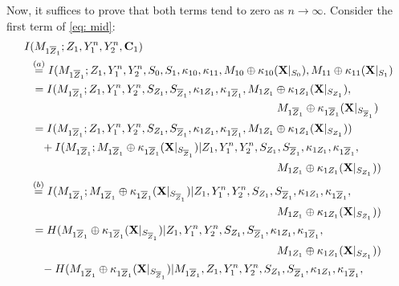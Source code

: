 \documentclass[runningheads]{llncs}
\newcommand{\parbreak}{ \vspace{0.3 em}}
\begin{document}
\begin{itemize}
    \parbreak Now, it suffices to prove that both terms tend to zero as $n\to\infty$. Consider the first term of \eqref{eq: mid}:
\begin{align}\label{final2: BC-nColl}
        I &(  M_{1\overline{Z}_1};Z_1, Y_1^n, Y_2^n,  \mathbf{C}_1)\notag\\
        & \overset{(a)}{=} I (  M_{1\overline{Z}_1};Z_1, Y_1^n, Y_2^n,  S_0,S_1, \kappa_{10}, \kappa_{11}, M_{10}\oplus\kappa_{10} (\mathbf{X}|_{S_0}), M_{11}\oplus\kappa_{11}(\mathbf{X}|_{S_1})\notag\\
        & \, = I (  M_{1\overline{Z}_1};Z_1, Y_1^n, Y_2^n,  S_{Z_1},S_{\overline{Z}_1}, \kappa_{1Z_1}, \kappa_{1\overline{Z}_1}, M_{1Z_1}\oplus\kappa_{1Z_1} (\mathbf{X}|_{S_{Z_1}}),\notag\\
        & \qquad \qquad \qquad \qquad \qquad \qquad \qquad \qquad \qquad \qquad \qquad M_{1\overline{Z}_1}\oplus\kappa_{1\overline{Z}_1}(\mathbf{X}|_{S_{\overline{Z}_1}})\notag\\
        & \, = I (  M_{1\overline{Z}_1};Z_1, Y_1^n, Y_2^n,  S_{Z_1},S_{\overline{Z}_1}, \kappa_{1Z_1}, \kappa_{1\overline{Z}_1}, M_{1Z_1}\oplus\kappa_{1Z_1} (\mathbf{X}|_{S_{Z_1}}))\notag\\
        & \quad + I (  M_{1\overline{Z}_1};M_{1\overline{Z}_1}\oplus\kappa_{1\overline{Z}_1}(\mathbf{X}|_{S_{\overline{Z}_1}})|Z_1, Y_1^n, Y_2^n,  S_{Z_1},S_{\overline{Z}_1}, \kappa_{1Z_1}, \kappa_{1\overline{Z}_1},\notag\\
        & \qquad \qquad \qquad \qquad \qquad \qquad \qquad \qquad \qquad \qquad \qquad M_{1Z_1}\oplus\kappa_{1Z_1} (\mathbf{X}|_{S_{Z_1}}))\notag\\
        & \overset{(b)}{=}I (  M_{1\overline{Z}_1};M_{1\overline{Z}_1}\oplus\kappa_{1\overline{Z}_1}(\mathbf{X}|_{S_{\overline{Z}_1}})|Z_1, Y_1^n, Y_2^n,  S_{Z_1},S_{\overline{Z}_1}, \kappa_{1Z_1}, \kappa_{1\overline{Z}_1},\notag\\
        & \qquad \qquad \qquad \qquad \qquad \qquad \qquad \qquad \qquad \qquad \qquad M_{1Z_1}\oplus\kappa_{1Z_1} (\mathbf{X}|_{S_{Z_1}}))\notag\\
        &\, = H (  M_{1\overline{Z}_1}\oplus\kappa_{1\overline{Z}_1}(\mathbf{X}|_{S_{\overline{Z}_1}})|Z_1, Y_1^n, Y_2^n,  S_{Z_1},S_{\overline{Z}_1}, \kappa_{1Z_1}, \kappa_{1\overline{Z}_1}, \notag\\
        & \qquad \qquad \qquad \qquad \qquad \qquad \qquad \qquad \qquad \qquad \qquad M_{1Z_1}\oplus\kappa_{1Z_1} (\mathbf{X}|_{S_{Z_1}}))\notag\\
        & \quad - H (  M_{1\overline{Z}_1}\oplus\kappa_{1\overline{Z}_1}(\mathbf{X}|_{S_{\overline{Z}_1}})|M_{1\overline{Z}_1},Z_1, Y_1^n, Y_2^n,  S_{Z_1},S_{\overline{Z}_1}, \kappa_{1Z_1}, \kappa_{1\overline{Z}_1}, \notag\\

\end{align}
\end{itemize}
\end{document}
